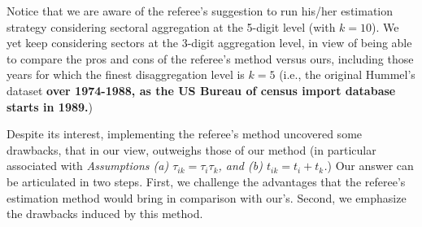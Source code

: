\documentclass[a4paper,11pt]{article}
\begin{document}
Notice that we are aware of the referee's suggestion to run his/her estimation strategy considering sectoral aggregation at the 5-digit level (with $k=10$). We yet keep considering sectors at the 3-digit aggregation level, in view of being able to compare the pros and cons of the referee's method versus ours, including those years for which the finest disaggregation level is $k=5$ (i.e., the original Hummel's dataset \textbf{over 1974-1988, as the US Bureau of census import database starts in 1989.})

Despite its interest, implementing the referee's method uncovered some drawbacks, that in our view, outweighs those of our method (in particular associated with \textit{Assumptions (a) $\tau_{ik} = \tau_i\tau_{k}$, and (b) $t_{ik} = t_i+ t_{k}$.}) Our answer can be articulated in two steps. First, we challenge the advantages that the referee's estimation method would bring in comparison with our's. Second, we emphasize the drawbacks induced by this method.
%
%
%
%
\end{document}
